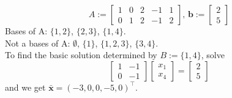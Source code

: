 \begin{exbox}
    \begin{example}[Bases of A]
        \[A:=
            \begin{bmatrix}
                1 & 0 & 2 & -1 & 1 \\
                0 & 1 & 2 & -1 & 2
            \end{bmatrix}
            \text{, }
            \bm{b}:=
            \begin{bmatrix}
                2 \\
                5
            \end{bmatrix}
        \]
        Bases of A\@: $\{1,2\}$, $\{2,3\}$, $\{1,4\}$.\\
        Not a bases of A\@: $\emptyset$, $\{1\}$, $\{1,2,3\}$, $\{3,4\}$.\\
        To find the basic solution determined by $B:=\{1,4\}$, solve
        \[
            \begin{bmatrix}
                1 & -1 \\
                0 & -1
            \end{bmatrix}
            \begin{bmatrix}
                x_1 \\
                x_4
            \end{bmatrix}
            =
            \begin{bmatrix}
                2 \\
                5
            \end{bmatrix}
        \]
        and we get $\bm{\bar{x}}=(-3,0,0,-5,0)^\top $.
    \end{example}
\end{exbox}
